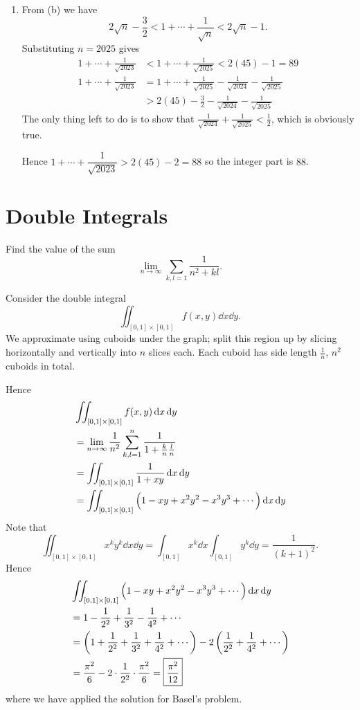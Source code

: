 \begin{solution}
\begin{enumerate}[label=(\alph*)]
\item From (b) we have
\[ 2\sqrt{n}-\frac{3}{2}<1+\cdots+\frac{1}{\sqrt{n}}<2\sqrt{n}-1. \]
Substituting $n=2025$ gives
\begin{align*}
1+\cdots+\frac{1}{\sqrt{2023}} &< 1+\cdots+\frac{1}{\sqrt{2025}} < 2(45)-1=89 \\
1+\cdots+\frac{1}{\sqrt{2023}} &= 1+\cdots+\frac{1}{\sqrt{2025}}-\frac{1}{\sqrt{2024}}-\frac{1}{\sqrt{2025}} \\
&> 2(45)-\frac{3}{2}-\frac{1}{\sqrt{2024}}-\frac{1}{\sqrt{2025}}
\end{align*}
The only thing left to do is to show that $\displaystyle\frac{1}{\sqrt{2024}}+\frac{1}{\sqrt{2025}}<\frac{1}{2}$, which is obviously true.

Hence $1+\cdots+\dfrac{1}{\sqrt{2023}}>2(45)-2=88$ so the integer part is $88$.
\end{enumerate}
\end{solution}
\pagebreak

\section{Double Integrals}
\begin{exercise}
Find the value of the sum
\[ \lim_{n\to\infty}\sum_{k,l=1}\frac{1}{n^2+kl}. \]
\end{exercise}

\begin{solution}
Consider the double integral
\[ \iint_{[0,1]\times[0,1]}f(x,y)\dd{x}\dd{y}. \]
We approximate using cuboids under the graph; split this region up by slicing horizontally and vertically into $n$ slices each. Each cuboid has side length $\frac{1}{n}$, $n^2$ cuboids in total.

Hence
\begin{align*}
&\iint_{[0,1]\times[0,1]}f(x,y)\dd{x}\dd{y} \\
&= \lim_{n\to\infty}\frac{1}{n^2}\sum_{k,l=1}^n\frac{1}{1+\frac{k}{n}\frac{l}{n}} \\
&= \iint_{[0,1]\times[0,1]}\frac{1}{1+xy}\dd{x}\dd{y} \\
&= \iint_{[0,1]\times[0,1]}\left(1-xy+x^2y^2-x^3y^3+\cdots\right)\dd{x}\dd{y}
\end{align*}
Note that
\[ \iint_{[0,1]\times[0,1]}x^ky^k\dd{x}\dd{y}=\int_{[0,1]}x^k\dd{x}\int_{[0,1]}y^k\dd{y}=\frac{1}{(k+1)^2}. \]
Hence
\begin{align*}
&\iint_{[0,1]\times[0,1]}\left(1-xy+x^2y^2-x^3y^3+\cdots\right)\dd{x}\dd{y} \\
&= 1-\frac{1}{2^2}+\frac{1}{3^2}-\frac{1}{4^2}+\cdots \\
&= \left(1+\frac{1}{2^2}+\frac{1}{3^2}+\frac{1}{4^2}+\cdots\right)-2\left(\frac{1}{2^2}+\frac{1}{4^2}+\cdots\right) \\
&= \frac{\pi^2}{6}-2\cdot\frac{1}{2^2}\cdot\frac{\pi^2}{6}=\boxed{\frac{\pi^2}{12}}
\end{align*}
where we have applied the solution for Basel's problem.
\end{solution}

